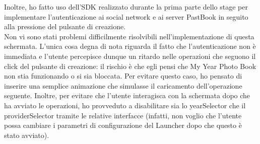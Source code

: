 				Inoltre, ho fatto uso dell'SDK realizzato durante la prima parte dello stage per implementare l'autenticazione ai
				social network e ai server PastBook in seguito alla pressione del pulsante di creazione.\\
				Non vi sono stati problemi difficilmente risolvibili nell'implementazione di questa schermata. L'unica cosa degna di
				nota riguarda il fatto che l'autenticazione non è immediata e l'utente percepisce dunque un ritardo nelle operazioni
				che seguono il click del pulsante di creazione: il rischio è che egli pensi che My Year Photo Book non stia
				funzionando o si sia bloccata. Per evitare questo caso, ho pensato di inserire una semplice animazione che
				simulasse il caricamento dell'operazione seguente. Inoltre, per evitare che l'utente interagisca con la schermata
				dopo che ha avviato le operazioni, ho provveduto a disabilitare sia lo yearSelector che il providerSelector tramite
				le relative interfacce (infatti, non voglio che l'utente possa cambiare i parametri di configurazione del Launcher
				dopo che questo è stato avviato).

